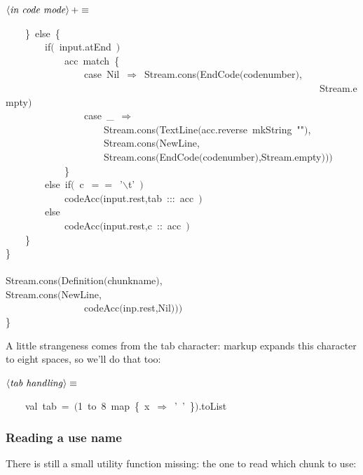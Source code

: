 \documentclass[a4paper,12pt]{article}
\begin{document}
$\left<\mbox{\emph{in code mode}}\right>+\equiv$
\begin{program}~~~~{\small\}}~{\vem else}~{\small\{}
\\~~~~~~~~{\vem if}$($~input.atEnd~$)$
\\~~~~~~~~~~~~acc~{\vem match}~{\small\{}
\\~~~~~~~~~~~~~~~~{\vem case}~Nil~$\Rightarrow$~Stream.cons$($EndCode$($codenumber$)$,
\\~~~~~~~~~~~~~~~~~~~~~~~~~~~~~~~~~~~~~~~~~~~~~~~~~~~~~~~~~~~~~~~~Stream.empty$)$
\\~~~~~~~~~~~~~~~~{\vem case}~\_~$\Rightarrow$
\\~~~~~~~~~~~~~~~~~~~~Stream.cons$($TextLine$($acc.reverse~mkString~""$)$,
\\~~~~~~~~~~~~~~~~~~~~Stream.cons$($NewLine,
\\~~~~~~~~~~~~~~~~~~~~Stream.cons$($EndCode$($codenumber$)$,Stream.empty$)$$)$$)$
\\~~~~~~~~~~~~{\small\}}
\\~~~~~~~~{\vem else}~{\vem if}$($~c~$==$~'$\backslash$t'~$)$
\\~~~~~~~~~~~~codeAcc$($input.rest,tab~{\rm :}{\rm :}{\rm :}~acc~$)$
\\~~~~~~~~{\vem else}
\\~~~~~~~~~~~~codeAcc$($input.rest,c~{\rm :}{\rm :}~acc~$)$
\\~~~~{\small\}}
\\{\small\}}
\\~~~~~~~~
\\Stream.cons$($Definition$($chunkname$)$,
\\Stream.cons$($NewLine,
\\~~~~~~~~~~~~~~~~codeAcc$($inp.rest,Nil$)$$)$$)$
\\{\small\}}
\\[0.5em]\end{program}


A little strangeness comes from the tab character: markup expands this character
to eight spaces, so we'll do that too:

$\left<\mbox{\emph{tab handling}}\right>\equiv$
\begin{program}~~~~{\vem val}~tab~=~$($1~to~8~map~{\small\{}~x~$\Rightarrow$~'~'~{\small\}}$)$.toList
\\[0.5em]\end{program}


\subsubsection{Reading a use name}
There is still a small utility function missing: the one to read which
chunk to use:
\end{document}
